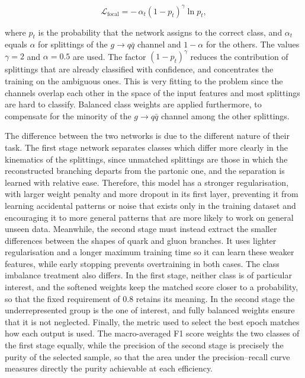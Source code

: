 \begin{equation}
  \mathcal{L}_{\text{focal}} = -\,\alpha_t \left( 1 - p_t \right)^{\gamma}
  \ln p_t ,
  \label{eq:focal}
\end{equation}

where $p_t$ is the probability that the network assigns to the correct class, and
$\alpha_t$ equals $\alpha$ for splittings of the $g \to q\bar{q}$ channel and
$1-\alpha$ for the others. The values $\gamma = 2$ and $\alpha = 0.5$ are used. The
factor $(1-p_t)^{\gamma}$ reduces the contribution of splittings that are already
classified with confidence, and concentrates the training on the ambiguous ones.
This is very fitting to the problem since the channels overlap each other in the 
space of the input features and most splittings are hard to classify. Balanced
class weights are applied furthermore, to compensate for the minority of the
$g \to q\bar{q}$ channel among the other splittings.

The difference between the two networks is due to the different nature of their task.
The first stage network separates classes which differ more clearly in the kinematics 
of the splittings, since unmatched splittings are those in which the
reconstructed branching departs from the partonic one, and the separation is
learned with relative ease. Therefore, this model has a stronger regularisation,
with larger weight penalty and more dropout in its first layer, preventing it from
learning accidental patterns or noise that exists only in the training dataset and 
encouraging it to more general patterns that are more likely to work on general unseen data.
Meanwhile, the second stage must instead extract the smaller
differences between the shapes of quark and gluon branches. It uses lighter 
regularisation and a longer maximum training time so it can learn these weaker 
features, while early stopping prevents overtraining in both cases. The class 
imbalance treatment also differs. In the first stage, neither class is of particular 
interest, and the softened weights keep the matched score closer to a probability, so 
that the fixed requirement of $0.8$ retains its meaning. In the second stage the underrepresented 
group is the one of interest, and fully balanced weights ensure that it is not neglected. 
Finally, the metric used to select the best epoch matches how each output is used. The 
macro-averaged F1 score weights the two classes of the first stage equally, while the 
precision of the second stage is precisely the purity of the selected sample, so that the 
area under the precision--recall curve measures directly the purity achievable at each efficiency.


